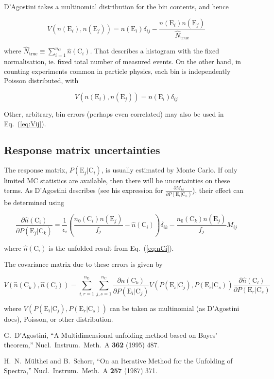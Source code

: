 \documentclass[12pt,a4paper]{article}
\newcommand{\E}{\mathrm{E}}
\newcommand{\C}{\mathrm{C}}
\newcommand{\dd}[2]{\frac{\partial{#1}}{\partial{#2}}}
\begin{document}
D'Agostini takes a multinomial distribution for the bin contents, and hence

\begin{equation}
V(n(\E_i),n(\E_j)) = n(\E_i) \delta_{ij} - \frac{n(\E_i) n(\E_j)}{\hat{N}_{\mathrm{true}}}
\end{equation}

where $\hat{N}_{\mathrm{true}} \equiv \sum_{i=1}^{n_{\C}} \hat{n}(\C_i)$.
That describes a histogram with the fixed normalisation, ie. fixed total number of measured events.
On the other hand, in counting experiments common in particle physics, each bin is independently Poisson distributed, with

\begin{equation}
V(n(\E_i),n(\E_j)) = n(\E_i) \delta_{ij}
\end{equation}

Other, arbitrary, bin errors (perhaps even correlated) may also be used in Eq.~(\ref{eq:Vij}).

\subsection{Response matrix uncertainties}

The response matrix, $P(\E_j|\C_i)$, is usually estimated by Monte Carlo. If only limited MC statistics
are available, then there will be uncertainties on these terms.
As D'Agostini describes (see his expression for $\dd{M_{ki}}{P(\E_r|\C_u)}$), 
their effect can be determined using

\begin{equation}
\dd{\hat{n}(\C_i)}{P(\E_j|\C_k)} = \frac{1}{\epsilon_i} \left( \frac{n_0(\C_i) n(\E_j)}{f_j} - \hat{n}(\C_i) \right) \delta_{ik}  - \frac{n_0(\C_k) n(\E_j)}{f_j} M_{ij} 
\label{eq:dnCidR}
\end{equation}

where $\hat{n}(\C_i)$ is the unfolded result from Eq.~(\ref{eq:nCi}). 

The covariance matrix due to these errors is given by

\begin{equation}
V(\hat{n}(\C_k),\hat{n}(\C_l)) = \sum_{i,r=1}^{n_{\E}} \sum_{j,s=1}^{n_{\C}} \dd{\hat{n}(\C_k)}{P(\E_i|\C_j)} V(P(\E_i|\C_j),P(\E_r|\C_s)) \dd{\hat{n}(\C_l)}{P(\E_r|\C_s)}
\end{equation}

where $V(P(\E_i|\C_j),P(\E_r|\C_s))$ can be taken as multinomial (as D'Agostini does), Poisson, or other distribution.

\begin{thebibliography}{99}

  G.~D'Agostini,
  ``A Multidimensional unfolding method based on Bayes' theorem,''
  Nucl.\ Instrum.\ Meth.\  A {\bf 362} (1995) 487.

  H.~N.~M\"ulthei and B.~Schorr,
  ``On an Iterative Method for the Unfolding of Spectra,''
  Nucl.\ Instrum.\ Meth.\  A {\bf 257} (1987) 371.

\end{thebibliography}
\end{document}
